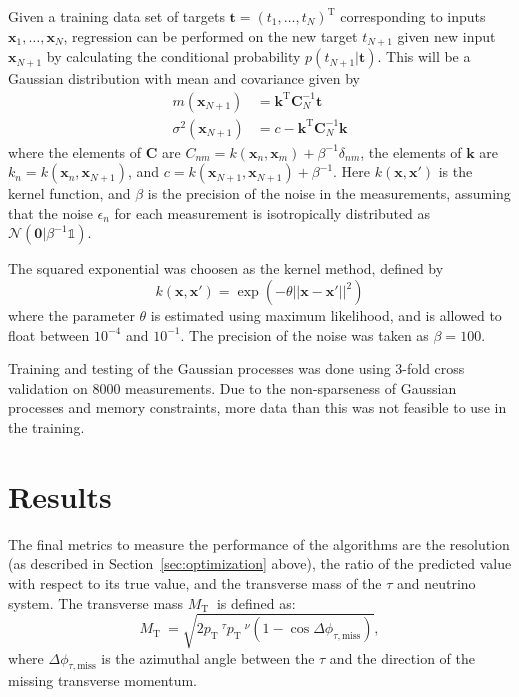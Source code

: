 \documentclass[twocolumn]{scrartcl}
\newcommand{\pt}{\ensuremath{p_\text{T}}~}
\newcommand{\mt}{\ensuremath{M_\text{T}}~}
\begin{document}
Given a training data set of targets $\mathbf t = (t_1,\ldots,t_N)^\text{T}$ corresponding to inputs $\mathbf x_1,\ldots,\mathbf x_N$, regression can be performed on the new target $t_{N+1}$ given new input $\mathbf x_{N+1}$ by calculating the conditional probability $p(t_{N+1}|\mathbf t)$. This will be a Gaussian distribution with mean and covariance given by
\begin{align}
    m(\mathbf x_{N+1}) &= \mathbf k^\text{T} \mathbf C^{-1}_N \mathbf t \\
    \sigma^2(\mathbf x_{N+1}) &= c - \mathbf k^\text{T} \mathbf C^{-1}_N \mathbf k
\end{align}
where the elements of $\mathbf C$ are $C_{nm} = k(\mathbf x_n, \mathbf x_m) + \beta^{-1}\delta_{nm}$, the elements of $\mathbf k$ are $k_n = k(\mathbf x_n, \mathbf x_{N+1})$, and $c = k(\mathbf x_{N+1}, \mathbf x_{N+1}) + \beta^{-1}$. Here $k(\mathbf x, \mathbf x')$ is the kernel function, and $\beta$ is the precision of the noise in the measurements, assuming that the noise $\epsilon_n$ for each measurement is isotropically distributed as $\mathcal N(\mathbf 0 | \beta^{-1}\mathbb 1)$.

The squared exponential was choosen as the kernel method, defined by
\begin{equation}
    k(\mathbf x, \mathbf x') = \exp( -\theta ||\mathbf x - \mathbf x'||^2 )
\end{equation}
where the parameter $\theta$ is estimated using maximum likelihood, and is allowed to float between $10^{-4}$ and $10^{-1}$. The precision of the noise was taken as $\beta = 100$. 

Training and testing of the Gaussian processes was done using 3-fold cross validation on 8000 measurements. Due to the non-sparseness of Gaussian processes and memory constraints, more data than this was not feasible to use in the training.
\section{Results}
\label{sec:results}

The final metrics to measure the performance of the algorithms are the resolution (as described in Section~\ref{sec:optimization} above), the ratio of the predicted value with respect to its true value, and the transverse mass of the $τ$ and neutrino system. The transverse mass $\mt$ is defined as:
\begin{equation}
  \label{eq:mt}
  \mt=\sqrt{ 2 \pt^\tau \pt^\nu   (1-\cos \Delta\phi_{\tau,\text{miss}}) },
\end{equation}
where $\Delta\phi_{\tau,\text{miss}}$ is the azimuthal angle between the $\tau$ and the direction of the missing transverse momentum. 
\end{document}
